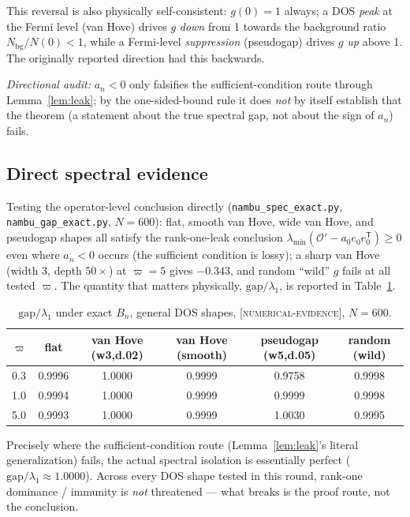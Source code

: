 \documentclass[11pt]{article}
\newcommand{\OO}{\mathcal{O}}
\begin{document}
This reversal is also physically self-consistent: $g(0)=1$ always; a DOS
\emph{peak} at the Fermi level (van Hove) drives $g$ \emph{down} from 1
towards the background ratio $N_{\text{bg}}/N(0)<1$, while a Fermi-level
\emph{suppression} (pseudogap) drives $g$ \emph{up} above 1. The originally
reported direction had this backwards.

\emph{Directional audit:} $a_n<0$ only falsifies the sufficient-condition
route through Lemma~\ref{lem:leak}; by the one-sided-bound rule it does
\emph{not} by itself establish that the theorem (a statement about the true
spectral gap, not about the sign of $a_n$) fails.

\subsection{Direct spectral evidence}\label{sec:direct-spectral}

Testing the operator-level conclusion directly
(\texttt{nambu\_spec\_exact.py}, \texttt{nambu\_gap\_exact.py}, $N=600$):
flat, smooth van Hove, wide van Hove, and pseudogap shapes all satisfy the
rank-one-leak conclusion $\lambda_{\min}(\OO'-a_0e_0e_0^{\mathsf T})\ge0$ even
where $a_n<0$ occurs (the sufficient condition is lossy); a sharp van Hove
(width 3, depth $50\times$) at $\varpi=5$ gives $-0.343$, and random
``wild'' $g$ fails at all tested $\varpi$. The quantity that matters
physically, $\mathrm{gap}/\lambda_1$, is reported in
Table~\ref{tab:gap-general-dos}.

\begin{table}[h]
\centering
\caption{$\mathrm{gap}/\lambda_1$ under exact $B_n$, general DOS shapes,
\textsc{[numerical-evidence]}, $N=600$.}
\label{tab:gap-general-dos}
\begin{tabular}{lccccc}
\toprule
$\varpi$ & flat & van Hove (w3,d.02) & van Hove (smooth) & pseudogap (w5,d.05) & random (wild)\\
\midrule
0.3 & 0.9996 & 1.0000 & 0.9999 & 0.9758 & 0.9998\\
1.0 & 0.9994 & 1.0000 & 0.9999 & 0.9999 & 0.9998\\
5.0 & 0.9993 & 1.0000 & 0.9999 & 1.0030 & 0.9995\\
\bottomrule
\end{tabular}
\end{table}

Precisely where the sufficient-condition route (Lemma~\ref{lem:leak}'s
literal generalization) fails, the actual spectral isolation is essentially
perfect ($\mathrm{gap}/\lambda_1\approx1.0000$). Across every DOS shape
tested in this round, rank-one dominance / immunity is \emph{not} threatened
--- what breaks is the proof route, not the conclusion.
\end{document}
